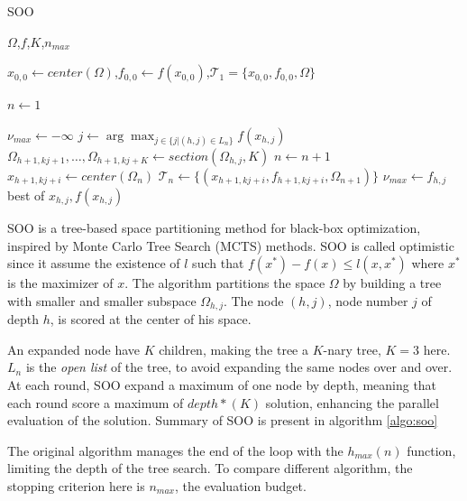 \documentclass[runningheads]{llncs}
\begin{document}
\begin{algorithm}
\caption{SOO}
\label{algo:soo}
\begin{algorithmic}[1]
\Require $\Omega$,$f$,$K$,$n_{max}$ 

\State $x_{0,0} \gets center(\Omega)$,$f_{0,0} \gets    f(x_{0,0})$,$\mathcal T_1 = \{x_{0,0},f_{0,0},\Omega\}$ 

\State $n \gets 1$

    \State $\nu_{max} \gets - \infty$
        \State $j \gets \arg \max_{j \in \{j | (h,j) \in L_n\}} f(x_{h,j})$ 
            \State $\Omega_{h+1,kj+1},\dots,\Omega_{h+1,kj+K} \gets section(\Omega_{h,j},K)$ 
                \State $n \gets n+1$
                \State $x_{h+1,kj+i} \gets center(\Omega_{n})$
                \State $\mathcal T_n \gets \{(x_{h+1,kj+i},f_{h+1,kj+i},\Omega_{n+1})\}$ 
            \EndFor  
            \State $\nu_{max} \gets f_{h,j}$
        \EndIf
    \EndFor
\EndWhile\\
\Return best of $x_{h,j},f(x_{h,j})$
\end{algorithmic}
\end{algorithm}

SOO is a tree-based space partitioning method for black-box optimization, inspired by Monte Carlo Tree Search (MCTS) methods. SOO is called optimistic since it assume the existence of $ l$ such that $f(x^*)-f(x) \leq l(x,x^*)$ where $x^*$ is the maximizer of $x$. The algorithm partitions the space $\Omega$ by building a tree with smaller and smaller subspace $\Omega_{h,j}$. The node $(h,j)$, node number $j$ of depth $h$, is scored at the center of his space. 

An expanded node have $K$ children, making the tree a $K$-nary tree, $K=3$ here. $L_n$ is the \textit{open list} of the tree, to avoid expanding the same nodes over and over. At each round, SOO expand a maximum of one node by depth, meaning that each round score a maximum of $depth*(K)$ solution, enhancing the parallel evaluation of the solution. Summary of SOO is present in algorithm \ref{algo:soo}

The original algorithm manages the end of the loop with the $h_{max}(n)$ function, limiting the depth of the tree search. To compare different algorithm, the stopping criterion here is $n_{max}$, the evaluation budget. 
\end{document}
